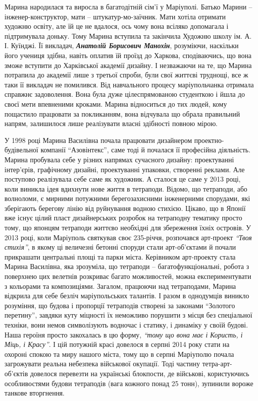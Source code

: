 
Марина народилася та виросла в багатодітній сім'ї у Маріуполі. Батько Марини –
інженер-конструктор, мати – штукатур-мо\hyp{}заїчник. Мати хотіла отримати художню
освіту, але їй це не вдалося, ось чому вона всіляко допомагала і підтримувала
доньку. Тому Марина вступила та закінчила Художню школу ім. А. І. Куїнджі. Її
викладач, \emph{\textbf{Анатолій Борисович Манохін}}, розуміючи, наскільки його учениця здібна,
навіть оплатив їй проїзд до Харкова, сподіваючись, що вона зможе вступити до
Харківської академії дизайну. І незважаючи на те, що Марина потрапила до
академії лише з третьої спроби, були свої життєві труднощі, все ж таки її
викладач не помилився. Від навчального процесу маріупольчанка отримала справжнє
задоволення. Вона була дуже цілеспрямованою студенткою і йшла до своєї мети
впевненими кроками. Марина відноситься до тих людей, кому пощастило працювати
за покликанням, вона відчувала що обрала правильний напрям, залишилося лише
реалізувати власні здібності повною мірою.


У 1998 році Марина Василівна почала працювати дизайнером проектно-будівельної
компанії \enquote{Азовінтекс}, саме тоді й почалася її професійна діяльність. Марина
пробувала себе у різних напрямах сучасного дизайну: проектуванні інтер'єрів,
графічному дизайні, проектуванні упаковки, створенні реклами. Але поступово
реалізувала себе саме як художник. А сталося це саме у 2013 році, коли виникла
ідея вдихнути нове життя в тетраподи. Відомо, що тетраподи, або волноломи, є
мирними потужними берегозахисними інженерними спорудами, які зберігають
берегову лінію від руйнування водною стихією. Цікаво, що в Японії вже існує
цілий пласт дизайнерських розробок на тетраподну тематику просто тому, що
японцям тетраподи життєво необхідні для збереження їхніх островів. У 2013 році,
коли Маріуполь святкував своє 235-річчя, розпочався арт-проект \emph{\enquote{Твоя стихія}}, в
якому ці величезні бетонні споруди стали арт-об'єктами й почали прикрашати
центральні площі та парки міста. Керівником арт-проекту стала Марина Василівна,
яка зрозуміла, що тетраподи – багатофункціональні, робота з поверхнею цих
велетнів розкриває багато можливостей, можна експериментувати з кольорами та
композиціями. Загалом, працюючи над тетраподами, Марина відкрила для себе
безліч маріупольських талантів. І разом в однодумців виникло розуміння, що
будова і пропорції тетраподів створені за законами \enquote{Золотого перетину}, завдяки
куту міцності їх неможливо порушити з місця без спеціальної техніки, вони немов
символізують водночас і статику, і динаміку у своїй будові. Наша героїня просто
закохалась в цю форму, \emph{\enquote{тому що вона має і Користь, і Міць, і Красу}}. І цій
потужній красі довелося в серпні 2014 року стати на охороні спокою та миру
нашого міста, тому що в серпні Маріуполю почала загрожувати реальна небезпека
військової окупації. Тоді частину тетра-арт-об'єктів довелося перевезти на
українські блокпости, де військові, користуючись особливостями будови
тетраподів (вага кожного понад 25 тонн), зупинили вороже танкове вторгнення.

